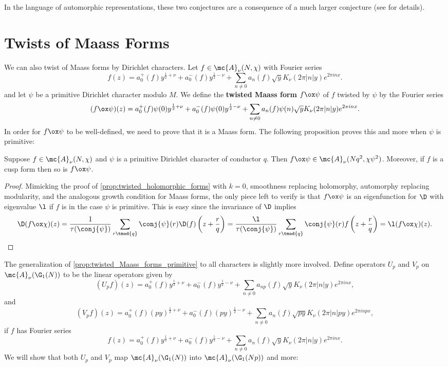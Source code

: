     In the language of automorphic representations, these two conjectures are a consequence of a much larger conjecture (see \cite{blomer2013role} for details).
  \section{Twists of Maass Forms}
    We can also twist of Maass forms by Dirichlet characters. Let $f \in \mc{A}_{\nu}(N,\chi)$ with Fourier series
    \[
      f(z) = a_{0}^{+}(f)y^{\frac{1}{2}+\nu}+a_{0}^{-}(f)y^{\frac{1}{2}-\nu}+\sum_{n \neq 0}a_{n}(f)\sqrt{y}K_{\nu}(2\pi|n|y)e^{2\pi inx}.
    \]
    and let $\psi$ be a primitive Dirichlet character modulo $M$. We define the \textbf{twisted Maass form} $f \ox \psi$ of $f$ twisted by $\psi$ by the Fourier series
    \[
      (f \ox \psi)(z) = a_{0}^{+}(f)\psi(0)y^{\frac{1}{2}+\nu}+a_{0}^{-}(f)\psi(0)y^{\frac{1}{2}-\nu}+\sum_{n \neq 0}a_{n}(f)\psi(n)\sqrt{y}K_{\nu}(2\pi|n|y)e^{2\pi inx}.
    \]
    In order for $f \ox \psi$ to be well-defined, we need to prove that it is a Maass form. The following proposition proves this and more when $\psi$ is primitive:

    \begin{proposition}\label{prop:twisted_Maass_forms_primitive}
      Suppose $f \in \mc{A}_{\nu}(N,\chi)$ and $\psi$ is a primitive Dirichlet character of conductor $q$. Then $f \ox \psi \in \mc{A}_{\nu}(Nq^{2},\chi\psi^{2})$. Moreover, if $f$ is a cusp form then so is $f \ox \psi$.
    \end{proposition}
    \begin{proof}
      Mimicking the proof of \cref{prop:twisted_holomorphic_forms} with $k = 0$, smoothness replacing holomorphy, automorphy replacing modularity, and the analogous growth condition for Maass forms, the only piece left to verify is that $f \ox \psi$ is an eigenfunction for $\D$ with eigenvalue $\l$ if $f$ is in the case $\psi$ is primitive. This is easy since the invariance of $\D$ implies
      \[
        \D(f \ox \chi)(z) = \frac{1}{\tau(\conj{\psi})}\sum_{r \tmod{q}}\conj{\psi}(r)\D(f)\left(z+\frac{r}{q}\right) =  \frac{\l}{\tau(\conj{\psi})}\sum_{r \tmod{q}}\conj{\psi}(r)f\left(z+\frac{r}{q}\right) = \l(f \ox \chi)(z).
      \]
    \end{proof}

    The generalization of \cref{prop:twisted_Maass_forms_primitive} to all characters is slightly more involved. Define operators $U_{p}$ and $V_{p}$ on $\mc{A}_{\nu}(\G_{1}(N))$ to be the linear operators given by
    \[
      (U_{p}f)(z) = a_{0}^{+}(f)y^{\frac{1}{2}+\nu}+a_{0}^{-}(f)y^{\frac{1}{2}-\nu}+\sum_{n \neq 0}a_{np}(f)\sqrt{y}K_{\nu}(2\pi|n|y)e^{2\pi inx},
    \]
    and
    \[
      (V_{p}f)(z) = a_{0}^{+}(f)(py)^{\frac{1}{2}+\nu}+a_{0}^{-}(f)(py)^{\frac{1}{2}-\nu}+\sum_{n \neq 0}a_{n}(f)\sqrt{py}K_{\nu}(2\pi|n|py)e^{2\pi inpx},
    \]
    if $f$ has Fourier series
    \[
      f(z) = a_{0}^{+}(f)y^{\frac{1}{2}+\nu}+a_{0}^{-}(f)y^{\frac{1}{2}-\nu}+\sum_{n \neq 0}a_{n}(f)\sqrt{y}K_{\nu}(2\pi|n|y)e^{2\pi inx}.
    \]
    We will show that both $U_{p}$ and $V_{p}$ map $\mc{A}_{\nu}(\G_{1}(N))$ into $\mc{A}_{\nu}(\G_{1}(Np))$ and more:

